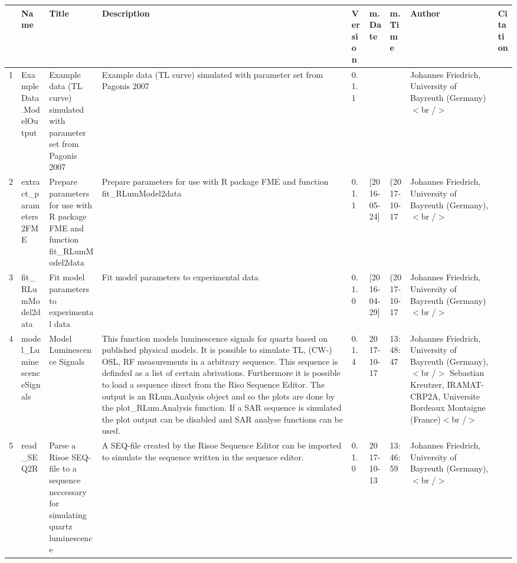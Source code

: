 \begin{table}[ht]
\centering
\begin{tabular}{rllllllll}
  \hline
 & Name & Title & Description & Version & m.Date & m.Time & Author & Citation \\ 
  \hline
1 & ExampleData.ModelOutput & Example data (TL curve) simulated with parameter set from Pagonis 2007 & Example data (TL curve) simulated with parameter set from Pagonis 2007 & 0.1.1
 &  &  & Johannes Friedrich, University of Bayreuth (Germany)$<$br /$>$ &  \\ 
  2 & extract\_parameters2FME & Prepare parameters for use with R package FME and function  fit\_RLumModel2data & Prepare parameters for use with R package FME and function  fit\_RLumModel2data & 0.1.1 & [2016-05-24] & (2017-10-17 & Johannes Friedrich, University of Bayreuth (Germany),$<$br /$>$ &  \\ 
  3 & fit\_RLumModel2data & Fit model parameters to experimental data & Fit model parameters to experimental data & 0.1.0 & [2016-04-29] & (2017-10-17 & Johannes Friedrich, University of Bayreuth (Germany)$<$br /$>$ &  \\ 
  4 & model\_LuminescenceSignals & Model Luminescence Signals & This function models luminescence signals for quartz based on published physical models. It is possible to simulate TL, (CW-) OSL, RF measurements in a arbitrary sequence. This sequence is definded as a  list  of certain abrivations. Furthermore it is possible to load a sequence direct from the Riso Sequence Editor. The output is an  RLum.Analysis object and so the plots are done by the  plot\_RLum.Analysis  function. If a SAR sequence is simulated the plot output can be disabled and SAR analyse functions can be used. & 0.1.4 & 2017-10-17 & 13:48:47
 & Johannes Friedrich, University of Bayreuth (Germany),$<$br /$>$ Sebastian Kreutzer, IRAMAT-CRP2A, Universite Bordeaux Montaigne (France)$<$br /$>$ &  \\ 
  5 & read\_SEQ2R & Parse a Risoe SEQ-file to a sequence neccessary for simulating quartz luminescence & A SEQ-file created by the Risoe Sequence Editor can be imported to simulate the sequence written in the sequence editor. & 0.1.0 & 2017-10-13 & 13:46:59
 & Johannes Friedrich, University of Bayreuth (Germany),$<$br /$>$ &  \\ 
   \hline
\end{tabular}
\end{table}

